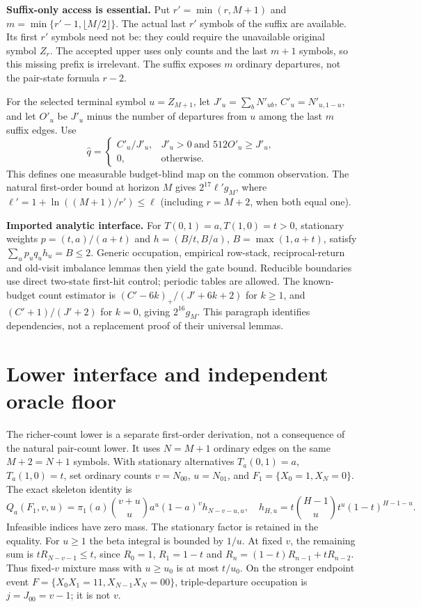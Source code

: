 \documentclass[10pt]{article}
\begin{document}
\textbf{Suffix-only access is essential.} Put $r'=\min(r,M+1)$ and
$m=\min\{r'-1,\lfloor M/2\rfloor\}$. The actual last $r'$ symbols of the suffix are available. Its first $r'$ symbols need not be: they could require the unavailable original symbol $Z_r$. The accepted upper uses only counts and the last $m+1$ symbols, so this missing prefix is irrelevant. The suffix exposes $m$ ordinary departures, not the pair-state formula $r-2$.

For the selected terminal symbol $u=Z_{M+1}$, let $J'_u=\sum_bN'_{ub}$, $C'_u=N'_{u,1-u}$, and let $O'_u$ be $J'_u$ minus the number of departures from $u$ among the last $m$ suffix edges. Use
\[
 \widehat q=\begin{cases}C'_u/J'_u,&J'_u>0\ \text{and }512O'_u\ge J'_u,\\0,&\text{otherwise.}\end{cases}
\]
This defines one measurable budget-blind map on the common observation. The natural first-order bound at horizon $M$ gives $2^{17}\ell'g_M$, where $\ell'=1+\ln((M+1)/r')\le\ell$ (including $r=M+2$, when both equal one).

\textbf{Imported analytic interface.} For $T(0,1)=a,T(1,0)=t>0$, stationary weights $p=(t,a)/(a+t)$ and $h=(B/t,B/a)$, $B=\max(1,a+t)$, satisfy $\sum_up_uq_uh_u=B\le2$. Generic occupation, empirical row-stack, reciprocal-return and old-visit imbalance lemmas then yield the gate bound. Reducible boundaries use direct two-state first-hit control; periodic tables are allowed. The known-budget count estimator is $(C'-6k)_+/(J'+6k+2)$ for $k\ge1$, and $(C'+1)/(J'+2)$ for $k=0$, giving $2^{16}g_M$. This paragraph identifies dependencies, not a replacement proof of their universal lemmas.
\newpage
\section{Lower interface and independent oracle floor}
The richer-count lower is a separate first-order derivation, not a consequence of the natural pair-count lower. It uses $N=M+1$ ordinary edges on the same $M+2=N+1$ symbols. With stationary alternatives $T_a(0,1)=a$, $T_a(1,0)=t$, set ordinary counts $v=N_{00}$, $u=N_{01}$, and $F_1=\{X_0=1,X_N=0\}$. The exact skeleton identity is
\[
 Q_a(F_1,v,u)=\pi_1(a)\binom{v+u}{u}a^u(1-a)^v h_{N-v-u,u},
 \quad h_{H,u}=t\binom{H-1}{u}t^u(1-t)^{H-1-u}.
\]
Infeasible indices have zero mass. The stationary factor is retained in the equality. For $u\ge1$ the beta integral is bounded by $1/u$. At fixed $v$, the remaining sum is $tR_{N-v-1}\le t$, since $R_0=1$, $R_1=1-t$ and
$R_n=(1-t)R_{n-1}+tR_{n-2}$. Thus fixed-$v$ mixture mass with $u\ge u_0$ is at most $t/u_0$. On the stronger endpoint event $F=\{X_0X_1=11,X_{N-1}X_N=00\}$, triple-departure occupation is $j=J_{00}=v-1$; it is not $v$.
\end{document}
